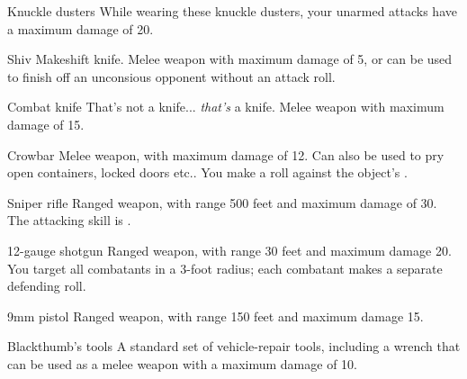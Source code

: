 
\begin{describe}{Knuckle dusters}
  While wearing these knuckle dusters, your unarmed attacks have a maximum damage of 20.
\end{describe}

\begin{describe}{Shiv}
  Makeshift knife. Melee weapon with maximum damage of 5, or can be used to finish off an unconsious opponent without an attack roll.
\end{describe}

\begin{describe}{Combat knife}
  That's not a knife... \emph{that's} a knife. Melee weapon with maximum damage of 15.
\end{describe}

\begin{describe}{Crowbar}
  Melee weapon, with maximum damage of 12. Can also be used to pry open containers, locked doors etc.. You make a  roll against the object's .
\end{describe}

\begin{describe}{Sniper rifle}
  Ranged weapon, with range 500 feet and maximum damage of 30. The attacking skill is .
\end{describe}

\begin{describe}{12-gauge shotgun}
  Ranged weapon, with range 30 feet and maximum damage 20. You target all combatants in a 3-foot radius; each combatant makes a separate defending roll.
\end{describe}

\begin{describe}{9mm pistol}
  Ranged weapon, with range 150 feet and maximum damage 15.
\end{describe}

\begin{describe}{Blackthumb's tools}
  A standard set of vehicle-repair tools, including a wrench that can be used as a melee weapon with a maximum damage of 10.
\end{describe}

